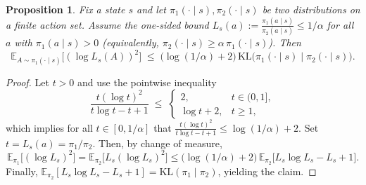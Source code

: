 \documentclass{article}
\newtheorem{proposition}{Proposition}[section]
\theoremstyle{definition}
\theoremstyle{remark}
\theoremstyle{plain}
\numberwithin{equation}{section}
\begin{document}
\begin{proposition}
\label{lem:kl-2}
Fix a state \(s\) and let \(\pi_1(\cdot\mid s),\pi_2(\cdot\mid s)\) be two distributions on a finite action set.
Assume the one-sided bound \(L_s(a):=\tfrac{\pi_1(a\mid s)}{\pi_2(a\mid s)}\le 1/\alpha\) for all \(a\) with \(\pi_1(a\mid s)>0\) (equivalently, \(\pi_2(\cdot\mid s)\ge \alpha\,\pi_1(\cdot\mid s)\)).
Then
\[
\mathbb E_{A \sim \pi_1(\cdot\mid s)}\!\big[(\log L_s(A))^2\big]
\;\le\; \big(\log(1/\alpha)+2\big)\,
\mathrm{KL}\!\big(\pi_1(\cdot\mid s)\mid \pi_2(\cdot\mid s)\big).
\]
\end{proposition}

\begin{proof}
Let \(t>0\) and use the pointwise inequality
\[
\frac{t(\log t)^2}{t\log t - t + 1} \;\le\;
\begin{cases}
2, & t\in(0,1],\\
\log t + 2, & t\ge 1,
\end{cases}
\]
which implies for all \(t\in[0,1/\alpha]\) that
\(\frac{t(\log t)^2}{t\log t - t + 1} \le \log(1/\alpha)+2\).
Set \(t=L_s(a)=\pi_1/\pi_2\). Then, by change of measure,
\[
\mathbb E_{\pi_1}\!\big[(\log L_s)^2\big]
=\mathbb E_{\pi_2}\!\big[L_s(\log L_s)^2\big]
\le \big(\log(1/\alpha)+2\big)\,\mathbb E_{\pi_2}\!\big[L_s\log L_s - L_s + 1\big].
\]
Finally, \(\mathbb E_{\pi_2}[L_s\log L_s - L_s + 1]=\mathrm{KL}(\pi_1\mid \pi_2)\), yielding the claim.
\end{proof}
\end{document}
